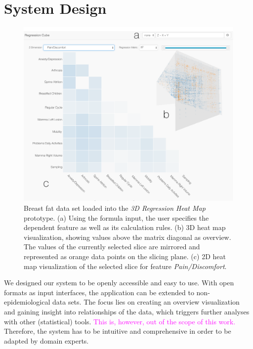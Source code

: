 \documentclass[journal]{style/vgtc} 			          %
\newcommand{\magenta}[1]{\textcolor{magenta}{#1}}
\begin{document}
\section{System Design} \label{sec:SystemDesign}
\begin{figure}[htb]
 \centering
 \includegraphics[width=1.0\linewidth]{figures/system}
 \caption{
 Breast fat data set loaded into the \emph{3D Regression Heat Map} prototype.
 (a) Using the formula input, the user specifies the dependent feature as well as its calculation rules.
 (b) 3D heat map visualization, showing values above the matrix diagonal as overview.
 The values of the currently selected slice are mirrored and represented as orange data points on the slicing plane.
 (c) 2D heat map visualization of the selected slice for feature \emph{Pain/Discomfort}.
 }
  \label{fig:System}
\end{figure}
\noindent We designed our system to be openly accessible and easy to use.
With open formats as input interfaces, the application can be extended to non-epidemiological data sets.
The focus lies on creating an overview visualization and gaining insight into relationships of the data, which triggers further analyses with other (statistical) tools.
\magenta{This is, however, out of the scope of this work.}
Therefore, the system has to be intuitive and comprehensive in order to be adapted by domain experts.
\end{document}
